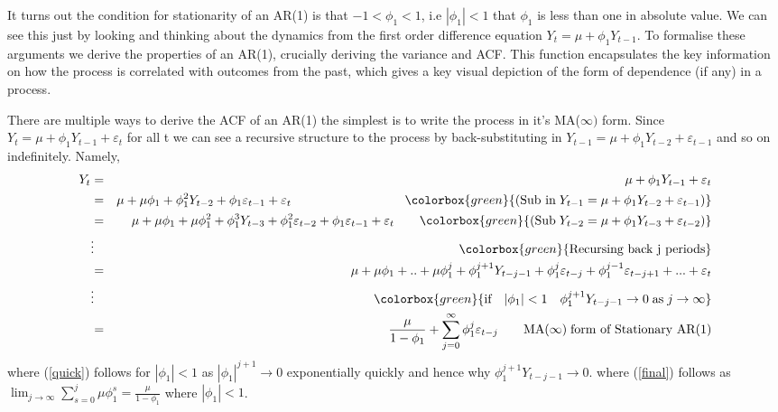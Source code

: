 \documentclass[openany]{tufte-book} %
\newcommand{\highlight}[1]{\colorbox{green}{\ensuremath{#1}}}
\begin{document}
It turns out the condition for stationarity of an AR(1) is that $-1<\phi_1<1 $, i.e $|\phi_1|<1$ that $\phi_1$ is less than one in absolute value. We can see this just by looking and thinking about the dynamics from the first order difference equation $Y_t=\mu +\phi_1 Y_{t-1}$.
        To formalise these arguments we derive the properties of an AR(1), crucially deriving the variance and ACF. This function encapsulates the key information on how the process is correlated with outcomes from the past, which gives a key visual depiction of the form of dependence (if any) in a process. \begin{fullwidth} There are multiple ways to derive the ACF of an AR(1) the simplest is to write the process in it's MA($\infty)$ form. Since $Y_t=\mu+\phi_1 Y_{t-1}+\varepsilon_t $ for all t we can see a recursive structure to the process by back-substituting in $Y_{t-1}=\mu +\phi_1 Y_{t-2}+\varepsilon_{t-1}$ and so on indefinitely. Namely,
         \begin{eqnarray}Y_t &=&\mu+ \phi_1Y_{t-1}+\varepsilon_t \\
&=&  \mu+\mu\phi_1+\phi_1^2Y_{t-2}+\phi_1\varepsilon_{t-1}+\varepsilon_t \qquad \qquad\qquad\qquad\quad \highlight{(\textrm{Sub in} \; Y_{t-1}=\mu+\phi_1 Y_{t-2}+\varepsilon_{t-1})} \\
&=&  \mu+\mu\phi_1+\mu\phi_1^2+ \phi_1^3Y_{t-3}+\phi_1^2\varepsilon_{t-2}+\phi_1\varepsilon_{t-1}+\varepsilon_t \qquad  \highlight{(\textrm{Sub} \; Y_{t-2}=\mu+\phi_1 Y_{t-3}+\varepsilon_{t-2})} \\
&\vdots&  \colorbox{green}{\textrm{Recursing back j periods}}
\\
&=& \mu+\mu\phi_1+..+\mu\phi_1^j+ \phi_1^{j+1}Y_{t-j-1}+\phi_1^j\varepsilon_{t-j}+ \phi_1^{j-1}\varepsilon_{t-j+1}+...+\varepsilon_t \label{quick}\\
&\vdots&  \highlight{\textrm{if}\quad|\phi_1|<1 \quad \phi_1^{j+1}Y_{t-j-1}\rightarrow 0 \;\textrm{as} \;j\rightarrow \infty} \\
&=&\frac{\mu}{1-\phi_1}+ \sum_{j=0}^\infty \phi_1^j \varepsilon_{t-j} \qquad \mathbf{\textrm{MA}(\infty) \;\textrm{form of Stationary AR(1)}} \label{final} \end{eqnarray}
  where (\ref{quick}) follows for $|\phi_1|<1$ as $|\phi_1|^{j+1}\rightarrow 0$ exponentially  quickly and hence why $ \phi_1^{j+1}Y_{t-j-1}\rightarrow 0$.
where (\ref{final}) follows as $\lim_{j\rightarrow \infty} \sum_{s=0}^j \mu\phi_1^s= \frac{\mu}{1-\phi_1}$ where $|\phi_1|<1$.  \end{fullwidth}
\end{document}
